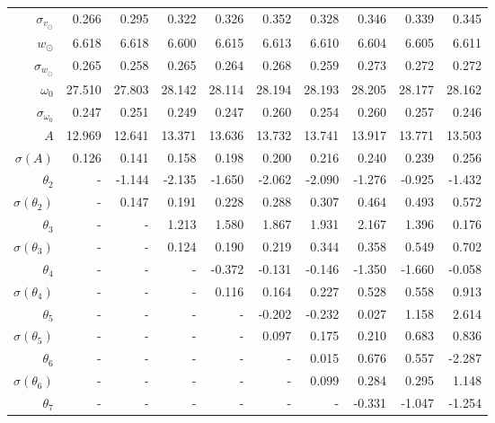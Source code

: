 \documentclass{matmex-diploma-custom}
\begin{document}
\begin{table}[h!!]
\begin{tabular}{r|rrr|r|rrrrr}
 $\sigma_{v_{\odot}}$&0.266       &    0.295 &    0.322 &    0.326 &    0.352 &    0.328 &    0.346 &    0.339 &    0.345 \\
 $w_{\odot} $& 6.618       &    6.618 &      6.600 &    6.615 &    6.613 &     6.610 &    6.604 &    6.605 &    6.611 \\
 $\sigma_{w_{\odot}}$&0.265       &    0.258 &    0.265 &    0.264 &    0.268 &    0.259 &    0.273 &    0.272 &    0.272 \\
 $\omega_0 $&27.510      &   27.803 &   28.142 &   28.114 &   28.194 &   28.193 &   28.205 &   28.177 &   28.162 \\
 $\sigma_{\omega_0} $& 0.247       &    0.251 &    0.249 &    0.247 &     0.260 &    0.254 &     0.260 &    0.257 &    0.246 \\\hline
 $A $&12.969      &   12.641 &   13.371 &   13.636 &   13.732 &   13.741 &   13.917 &   13.771 &   13.503 \\
 $\sigma(A) $ & 0.126       &    0.141 &    0.158 &    0.198 &      0.200 &    0.216 &     0.240 &    0.239 &    0.256 \\
 $\theta_2$&-        &  -1.144 &   -2.135 &    -1.650 &   -2.062 &    -2.090 &   -1.276 &   -0.925 &   -1.432 \\
 $\sigma(\theta_2)$&-      &    0.147 &    0.191 &    0.228 &    0.288 &    0.307 &    0.464 &    0.493 &    0.572 \\
 $\theta_3$&-      &    - &   1.213 &    1.580 &    1.867 &    1.931 &    2.167 &    1.396 &    0.176 \\
 $\sigma(\theta_3)$&-      &    - &   0.124 &    0.190 &    0.219 &    0.344 &    0.358 &    0.549 &    0.702 \\
 $\theta_4$&-      &    - &    - &  -0.372 &   -0.131 &   -0.146 &   -1.350 &   -1.660 &   -0.058 \\
 $\sigma(\theta_4)$&-      &    - &    - &    0.116 &    0.164 &    0.227 &    0.528 &    0.558 &    0.913 \\
 $\theta_5$&-      &    - &    - &    - &  -0.202 &   -0.232 &    0.027 &    1.158 &    2.614 \\
 $\sigma(\theta_5)$&-      &    - &    - &    - &    0.097 &    0.175 &    0.210 &    0.683 &    0.836 \\
 $\theta_6$&-      &    - &    - &    - &    - &   0.015 &    0.676 &    0.557 &   -2.287 \\
 $\sigma(\theta_6)$&-    &    - &    - &    - &    - &   0.099 &    0.284 &    0.295 &    1.148 \\
 $\theta_7$&-     &    - &    - &    - &    - &    - &  -0.331 &   -1.047 &   -1.254 \\

\end{tabular}
\end{table}
\end{document}
